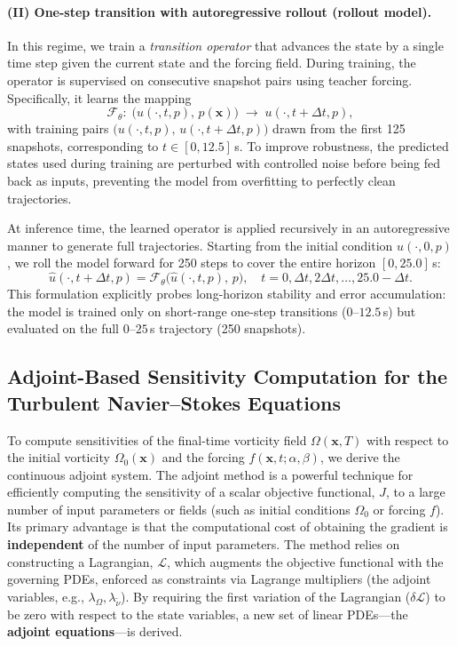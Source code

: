 \paragraph{(II) One-step transition with autoregressive rollout (rollout model).}  
In this regime, we train a \emph{transition operator} that advances the state by a single time step given the current state and the forcing field. During training, the operator is supervised on consecutive snapshot pairs using teacher forcing. Specifically, it learns the mapping
\[
\mathcal{F}_\theta:\; \big(u(\cdot,t,p),\, p(\mathbf{x})\big)\;\longrightarrow\; u(\cdot,t+\Delta t,p),
\]
with training pairs $\big(u(\cdot,t,p),\, u(\cdot,t+\Delta t,p)\big)$ drawn from the first 125 snapshots, corresponding to $t \in [0,12.5]$\,s. To improve robustness, the predicted states used during training are perturbed with controlled noise before being fed back as inputs, preventing the model from overfitting to perfectly clean trajectories.  

At inference time, the learned operator is applied recursively in an autoregressive manner to generate full trajectories. Starting from the initial condition $u(\cdot,0,p)$, we roll the model forward for 250 steps to cover the entire horizon $[0,25.0]$\,s:  
\[
\hat{u}(\cdot,t+\Delta t,p)=\mathcal{F}_\theta\!\big(\hat{u}(\cdot,t,p),\,p\big), \quad t=0,\Delta t,2\Delta t,\ldots,25.0-\Delta t.
\]
This formulation explicitly probes long-horizon stability and error accumulation: the model is trained only on short-range one-step transitions ($0$–$12.5$\,s) but evaluated on the full $0$–$25$\,s trajectory (250 snapshots).  

\subsection*{Adjoint-Based Sensitivity Computation for the Turbulent Navier--Stokes Equations}
\label{sec:adjoint_nse}

To compute sensitivities of the final-time vorticity field $\Omega(\mathbf{x}, T)$ with respect to the initial vorticity $\Omega_0(\mathbf{x})$ and the forcing $f(\mathbf{x}, t; \alpha, \beta)$, we derive the continuous adjoint system. The adjoint method is a powerful technique for efficiently computing the sensitivity of a scalar objective functional, $J$, to a large number of input parameters or fields (such as initial conditions $\Omega_0$ or forcing $f$). Its primary advantage is that the computational cost of obtaining the gradient is \textbf{independent} of the number of input parameters. The method relies on constructing a Lagrangian, $\mathcal{L}$, which augments the objective functional with the governing PDEs, enforced as constraints via Lagrange multipliers (the adjoint variables, e.g., $\lambda_\Omega, \lambda_{\tilde{\nu}}$). By requiring the first variation of the Lagrangian ($\delta\mathcal{L}$) to be zero with respect to the state variables, a new set of linear PDEs—the \textbf{adjoint equations}—is derived.

